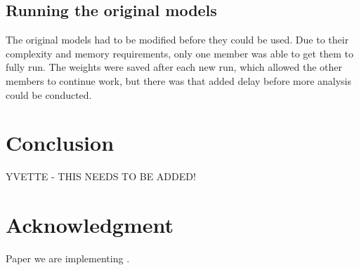 \documentclass[conference]{IEEEtran}
\begin{document}
	\subsection{Running the original models}
	The original models had to be modified before they could be used. 
	Due to their complexity and memory requirements, only one member was able to get them to fully run.
	The weights were saved after each new run, which allowed the other members to continue work, but there was that added delay before more analysis could be conducted.
	
	\section{Conclusion}
	YVETTE - THIS NEEDS TO BE ADDED!
	
	\section*{Acknowledgment}
	
	Paper we are implementing \cite{2022_Leveraging_sound}.
	
	\nocite{*}
	\printbibliography
	
\end{document}
